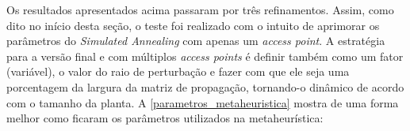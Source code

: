 \documentclass[
	12pt,				%
	twoside,			%
	a4paper,			%
	english,			%
	french,				%
	spanish,			%
	brazil				%
	]{abntex2}
\begin{document}
Os resultados apresentados acima passaram por três refinamentos. Assim,
como dito no início desta seção, o teste foi realizado com o intuito de
aprimorar os parâmetros do \emph{Simulated Annealing} com apenas um
\emph{access point}. A estratégia para a versão final e com múltiplos
\emph{access points} é definir também como um fator (variável), o valor
do raio de perturbação e fazer com que ele seja uma porcentagem da
largura da matriz de propagação, tornando-o dinâmico de acordo com o
tamanho da planta. A \autoref{parametros_metaheuristica} mostra de uma
forma melhor como ficaram os parâmetros utilizados na metaheurística:

\begin{table}[]
    \centering
    \caption{Parâmetros definitivos utilizados na metaheurística}
    \label{parametros_metaheuristica}
\end{table}
\end{document}
